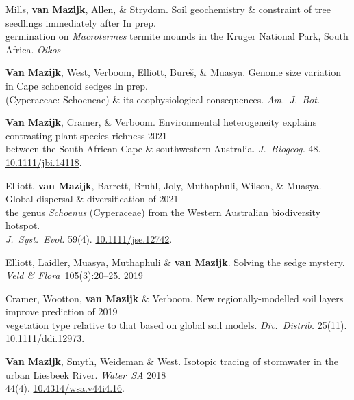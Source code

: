 Mills, \textbf{van Mazijk}, Allen, \& Strydom.
Soil geochemistry \& constraint of tree seedlings immediately after
                                                              \hfill In prep. \\
\hspace{2em} germination on \textit{Macrotermes} termite
  mounds in the Kruger National Park, South Africa.
  \textit{Oikos}

\textbf{Van Mazijk}, West, Verboom, Elliott, Bureš, \& Muasya.
Genome size variation in Cape schoenoid sedges                \hfill In prep. \\
\hspace{2em} (Cyperaceae: Schoeneae) \& its ecophysiological consequences.
  \textit{Am.~J.~Bot.}

\textbf{Van Mazijk}, Cramer, \& Verboom.
Environmental heterogeneity explains contrasting plant species richness
                                                                  \hfill 2021 \\
\hspace{2em}
  between the South African Cape \& southwestern Australia.
  \textit{J.~Biogeog.}
  48. \href{https://doi.org/10.1111/jbi.14118}{10.1111/jbi.14118}.

Elliott, \textbf{van Mazijk}, Barrett, Bruhl,
Joly, Muthaphuli, Wilson, \& Muasya.
Global dispersal \& diversification of                            \hfill 2021 \\
\hspace{2em}
  the genus \textit{Schoenus} (Cyperaceae)
  from the Western Australian biodiversity hotspot.                           \\
\hspace{2em}
  \textit{J.~Syst.~Evol.}
  59(4).
  \href{https://doi.org/10.1111/jse.1274}{10.1111/jse.12742}.

Elliott, Laidler, Muasya, Muthaphuli \& \textbf{van Mazijk}.
Solving the sedge mystery.
\textit{Veld \& Flora}~105(3):20--25.                             \hfill 2019

Cramer, Wootton, \textbf{van Mazijk} \& Verboom.
New regionally-modelled soil layers improve prediction of         \hfill 2019 \\
\hspace{2em}
  vegetation type relative to that based on global soil models.
  \textit{Div.~Distrib.}
  25(11).                                                        
  \href{https://doi.org/10.1111/ddi.12973}{10.1111/ddi.12973}.

\textbf{Van Mazijk}, Smyth, Weideman \& West.
Isotopic tracing of stormwater in the urban Liesbeek River.
\textit{Water~SA}                                                 \hfill 2018 \\
\hspace{2em}
  44(4).
  \href{https://doi.org/10.4314/wsa.v44i4.16}{10.4314/wsa.v44i4.16}.
